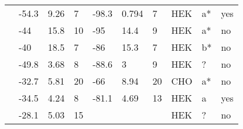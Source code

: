 \begin{longtable}{p{6cm}|lll|lll|lll}
\citet{Yang2002MutationDB} & -54.3 & 9.26 & 7 & -98.3 & 0.794 & 7 & HEK & a* & yes \\
\citet{Ye2003MutationDB} & -44 & 15.8 & 10 & -95 & 14.4 & 9 & HEK & a* & no \\
\citet{Ye2003MutationDB} & -40 & 18.5 & 7 & -86 & 15.3 & 7 & HEK & b* & no \\
\citet{Yokoi2005MutationDB} & -49.8 & 3.68 & 8 & -88.6 & 3 & 9 & HEK & ? & no \\
\citet{Young2005MutationDB} & -32.7 & 5.81 & 20 & -66 & 8.94 & 20 & CHO & a* & no \\
\citet{Zeng2013MutationDB} & -34.5 & 4.24 & 8 & -81.1 & 4.69 & 13 & HEK & a & yes \\
\citet{Zhang2015MutationDB} & -28.1 & 5.03 & 15 & && & HEK & ? & no \\
\end{longtable}
